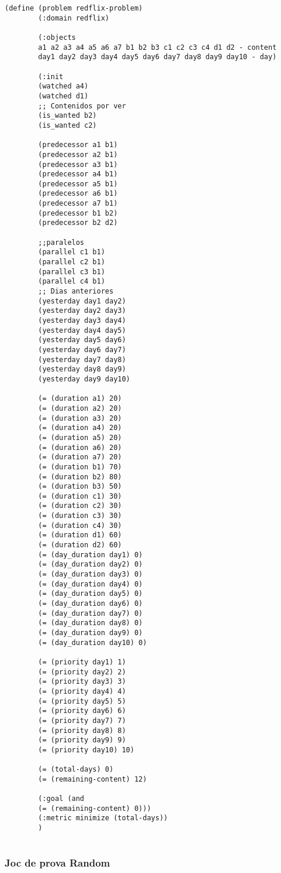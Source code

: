 \documentclass[a4paper]{article}
\begin{document}
	\begin{lstlisting}[language=PDDL, caption={Joc de Prova 2 - Extensió 4}, label={lst:JP24}]                    
		(define (problem redflix-problem)
		(:domain redflix)
		
		(:objects
		a1 a2 a3 a4 a5 a6 a7 b1 b2 b3 c1 c2 c3 c4 d1 d2 - content
		day1 day2 day3 day4 day5 day6 day7 day8 day9 day10 - day)
		
		(:init
		(watched a4)
		(watched d1)
		;; Contenidos por ver
		(is_wanted b2)
		(is_wanted c2)
		
		(predecessor a1 b1)
		(predecessor a2 b1)
		(predecessor a3 b1)
		(predecessor a4 b1)
		(predecessor a5 b1)
		(predecessor a6 b1)
		(predecessor a7 b1)
		(predecessor b1 b2)
		(predecessor b2 d2)
		
		;;paralelos
		(parallel c1 b1)
		(parallel c2 b1)
		(parallel c3 b1)
		(parallel c4 b1)
		;; Dias anteriores
		(yesterday day1 day2)
		(yesterday day2 day3)
		(yesterday day3 day4)
		(yesterday day4 day5)
		(yesterday day5 day6)
		(yesterday day6 day7)
		(yesterday day7 day8)
		(yesterday day8 day9)
		(yesterday day9 day10)
		
		(= (duration a1) 20)
		(= (duration a2) 20)
		(= (duration a3) 20)
		(= (duration a4) 20)
		(= (duration a5) 20)
		(= (duration a6) 20)
		(= (duration a7) 20)
		(= (duration b1) 70)
		(= (duration b2) 80)
		(= (duration b3) 50)
		(= (duration c1) 30)
		(= (duration c2) 30)
		(= (duration c3) 30)
		(= (duration c4) 30)
		(= (duration d1) 60)
		(= (duration d2) 60)
		(= (day_duration day1) 0)
		(= (day_duration day2) 0)
		(= (day_duration day3) 0)
		(= (day_duration day4) 0)
		(= (day_duration day5) 0)
		(= (day_duration day6) 0)
		(= (day_duration day7) 0)
		(= (day_duration day8) 0)
		(= (day_duration day9) 0)
		(= (day_duration day10) 0)
		
		(= (priority day1) 1)
		(= (priority day2) 2)
		(= (priority day3) 3)
		(= (priority day4) 4)
		(= (priority day5) 5)
		(= (priority day6) 6)
		(= (priority day7) 7)
		(= (priority day8) 8)
		(= (priority day9) 9)
		(= (priority day10) 10)
		
		(= (total-days) 0)
		(= (remaining-content) 12) 
		
		(:goal (and
		(= (remaining-content) 0)))
		(:metric minimize (total-days))
		)
		
	\end{lstlisting}
	
	
	\subsubsection*{Joc de prova Random}
	
\end{document}
